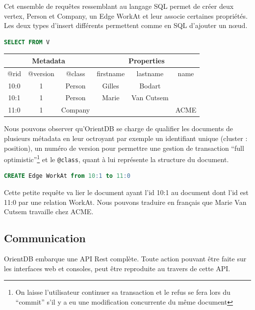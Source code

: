 \documentclass[a4paper,fleqn,12pt,oneside]{report}
\begin{document}
Cet ensemble de requêtes ressemblant au langage SQL permet de créer deux vertex, Person et Company, un Edge WorkAt et leur associe certaines propriétés. Les deux types d’insert différents permettent comme en SQL d’ajouter un nœud.

\begin{lstlisting}[language=SQL]
SELECT FROM V
\end{lstlisting}
\begin{center}
	\begin{tabular}{|c|c|c|c|c|c|}
   		\hline
  		\multicolumn{3}{|c|}{Metadata} & \multicolumn{3}{c|}{Properties} \\
   		\hline
   		@rid & @version & @class & firstname & lastname & name \\
   		\hline
   		10:0 & 1 & Person & Gilles & Bodart &  \\
   		10:1 & 1 & Person & Marie & Van Cutsem &  \\
   		11:0 & 1 & Company &  &  & ACME \\
   		\hline
	\end{tabular}
\end{center}

Nous pouvons observer qu'OrientDB se charge de qualifier les documents de plusieurs métadata en leur octroyant par exemple un identifiant unique (\no cluster : position), un numéro de version pour permettre une gestion de transaction \enquote{full optimistic}\footnote{On laisse l'utilisateur continuer sa transaction et le refus se fera lors du \enquote{commit} s'il y a eu une modification concurrente du même document} et le \texttt{@class}, quant à lui représente la structure du document.

\begin{lstlisting}[language=SQL]
CREATE Edge WorkAt from 10:1 to 11:0
\end{lstlisting}

Cette petite requête va lier le document ayant l'id 10:1 au document dont l'id est 11:0 par une relation WorkAt. Nous pouvons traduire en français que Marie Van Cutsem travaille chez ACME.\cite{OrientDBGettingStarted}


\subsection{Communication}

OrientDB embarque une API Rest complète\cite{fielding2000architectural}. Toute action pouvant être faite sur les interfaces web et consoles, peut être reproduite au travers de cette API.
\end{document}
